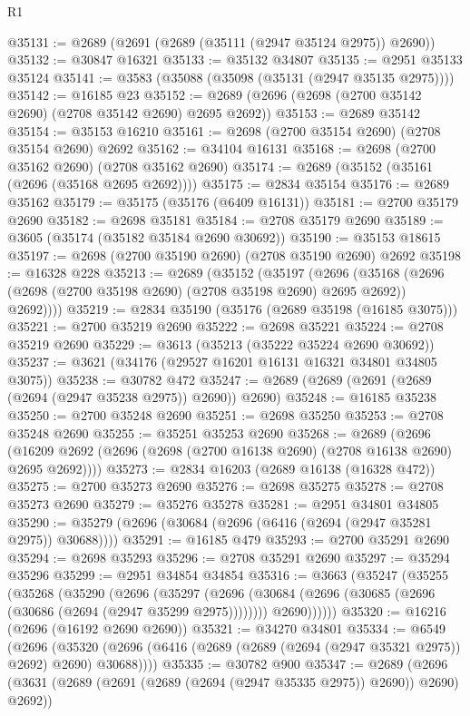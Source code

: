 \begin{lexlean}{R1}
\begin{coremodule}
@35131 := @2689 (@2691 (@2689 (@35111 (@2947 @35124 @2975)) @2690))
@35132 := @30847 @16321
@35133 := @35132 @34807
@35135 := @2951 @35133 @35124
@35141 := @3583 (@35088 (@35098 (@35131 (@2947 @35135 @2975))))
@35142 := @16185 @23
@35152 := @2689 (@2696 (@2698 (@2700 @35142 @2690) (@2708 @35142 @2690) @2695 @2692))
@35153 := @2689 @35142
@35154 := @35153 @16210
@35161 := @2698 (@2700 @35154 @2690) (@2708 @35154 @2690) @2692
@35162 := @34104 @16131
@35168 := @2698 (@2700 @35162 @2690) (@2708 @35162 @2690)
@35174 := @2689 (@35152 (@35161 (@2696 (@35168 @2695 @2692))))
@35175 := @2834 @35154
@35176 := @2689 @35162
@35179 := @35175 (@35176 (@6409 @16131))
@35181 := @2700 @35179 @2690
@35182 := @2698 @35181
@35184 := @2708 @35179 @2690
@35189 := @3605 (@35174 (@35182 @35184 @2690 @30692))
@35190 := @35153 @18615
@35197 := @2698 (@2700 @35190 @2690) (@2708 @35190 @2690) @2692
@35198 := @16328 @228
@35213 := @2689
    (@35152
      (@35197
        (@2696
          (@35168 (@2696 (@2698 (@2700 @35198 @2690) (@2708 @35198 @2690) @2695 @2692)) @2692))))
@35219 := @2834 @35190 (@35176 (@2689 @35198 (@16185 @3075)))
@35221 := @2700 @35219 @2690
@35222 := @2698 @35221
@35224 := @2708 @35219 @2690
@35229 := @3613 (@35213 (@35222 @35224 @2690 @30692))
@35237 := @3621 (@34176 (@29527 @16201 @16131 @16321 @34801 @34805 @3075))
@35238 := @30782 @472
@35247 := @2689 (@2689 (@2691 (@2689 (@2694 (@2947 @35238 @2975)) @2690)) @2690)
@35248 := @16185 @35238
@35250 := @2700 @35248 @2690
@35251 := @2698 @35250
@35253 := @2708 @35248 @2690
@35255 := @35251 @35253 @2690
@35268 := @2689
    (@2696 (@16209 @2692 (@2696 (@2698 (@2700 @16138 @2690) (@2708 @16138 @2690) @2695 @2692))))
@35273 := @2834 @16203 (@2689 @16138 (@16328 @472))
@35275 := @2700 @35273 @2690
@35276 := @2698 @35275
@35278 := @2708 @35273 @2690
@35279 := @35276 @35278
@35281 := @2951 @34801 @34805
@35290 := @35279 (@2696 (@30684 (@2696 (@6416 (@2694 (@2947 @35281 @2975)) @30688))))
@35291 := @16185 @479
@35293 := @2700 @35291 @2690
@35294 := @2698 @35293
@35296 := @2708 @35291 @2690
@35297 := @35294 @35296
@35299 := @2951 @34854 @34854
@35316 := @3663
    (@35247
      (@35255
        (@35268
          (@35290
            (@2696
              (@35297
                (@2696 (@30684 (@2696 (@30685 (@2696 (@30686 (@2694 (@2947 @35299 @2975))))))))
                @2690))))))
@35320 := @16216 (@2696 (@16192 @2690 @2690))
@35321 := @34270 @34801
@35334 := @6549
    (@2696 (@35320 (@2696 (@6416 (@2689 (@2689 (@2694 (@2947 @35321 @2975)) @2692) @2690) @30688))))
@35335 := @30782 @900
@35347 := @2689
    (@2696 (@3631 (@2689 (@2691 (@2689 (@2694 (@2947 @35335 @2975)) @2690)) @2690) @2692))

\end{coremodule}
\end{lexlean}
